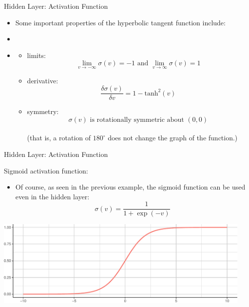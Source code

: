 \documentclass[11pt,compress,t,notes=noshow]{beamer}
\newenvironment{knitrout}{}{} %
\newenvironment{blocki}[1]   %
{
 \begin{block}{#1}\begin{itemize}
}
{
\end{itemize}\end{block}
}
\begin{document}
\begin{frame} {Hidden Layer: Activation Function}
  \begin{itemize}
    \item Some important properties of the hyperbolic tangent function include:
    \item[]
    \item[]
    \begin{itemize}
      \item limits: $$\lim_{v \to -\infty} \sigma(v) = -1 \text{ and } \lim_{v \to \infty} \sigma(v) = 1$$
      \item derivative: $$\frac{\delta\sigma(v)}{\delta v} = 1 - \text{tanh}^2(v)$$
      \item symmetry: $$\sigma(v) \text{ is rotationally symmetric about } (0, 0)$$ \\
      (that is, a rotation of $180^{\circ}$ does not change the graph of the function.)
    \end{itemize}
  \end{itemize}
\end{frame}

\begin{frame} {Hidden Layer: Activation Function}
  \begin{blocki}{Sigmoid activation function:}
  \item Of course, as seen in the previous example, the sigmoid function can be used even in the hidden layer:
    $$ \sigma(v) = \frac{1}{1+\exp (-v)} $$
  \end{blocki}
\begin{knitrout}\scriptsize
{}\color{fgcolor}

{\centering \includegraphics[width=0.95\textwidth]{figure/unnamed-chunk-4-1} 

}



\end{knitrout}
\end{frame}
\end{document}
